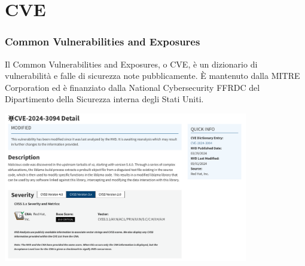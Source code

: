 
\section{CVE} %


\begin{frame}
\frametitle{Common Vulnerabilities and Exposures}
Il Common Vulnerabilities and Exposures, o CVE,
è un dizionario di vulnerabilità e falle di sicurezza note pubblicamente. È mantenuto dalla MITRE 
Corporation ed è finanziato dalla National Cybersecurity FFRDC del Dipartimento della Sicurezza interna 
degli Stati Uniti.

\includegraphics[width=0.8\textwidth]{img/1-CVE/CVE.png}

\end{frame}

